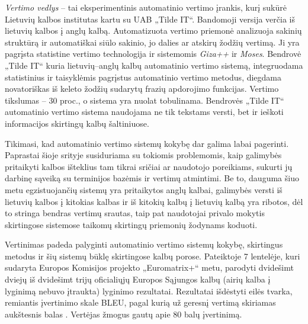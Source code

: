 \begin{multicols}{2}
   \textit{Vertimo vedlys}  – tai eksperimentinis automatinio vertimo įrankis, kurį sukūrė Lietuvių kalbos institutas kartu su UAB „Tilde IT“. Bandomoji versija verčia iš lietuvių kalbos į anglų kalbą. Automatizuota vertimo priemonė analizuoja sakinių struktūrą ir automatiškai siūlo sakinio, jo dalies ar atskirų žodžių vertimą. Ji yra pagrįsta statistine vertimo technologija ir sistemomis \textit{Giza++}  ir \textit{Moses}. Bendrovė „Tilde IT“ kuria lietuvių–anglų kalbų automatinio vertimo sistemą, integruodama statistinius ir taisyklėmis pagrįstus automatinio vertimo metodus, diegdama novatoriškas iš keleto žodžių sudarytų frazių apdorojimo funkcijas. Vertimo tikslumas – 30 proc., o sistema yra nuolat tobulinama. Bendrovės „Tilde IT“ automatinio vertimo sistema naudojama ne tik tekstams versti, bet ir ieškoti informacijos skirtingų kalbų šaltiniuose.   

    Tikimasi, kad automatinio vertimo sistemų kokybę dar galima labai pagerinti. Paprastai šioje srityje susiduriama su tokiomis problemomis, kaip galimybės pritaikyti kalbos išteklius tam tikrai sričiai ar naudotojo poreikiams, sukurti jų darbinę sąveiką su terminijos bazėmis ir vertimų atmintimi. Be to, dauguma šiuo metu egzistuojančių sistemų yra pritaikytos anglų kalbai, galimybės versti iš lietuvių kalbos į kitokias kalbas ir iš kitokių kalbų į lietuvių kalbą yra ribotos, dėl to stringa bendras vertimų srautas, taip pat naudotojai privalo mokytis skirtingose sistemose taikomų skirtingų priemonių žodynams koduoti.   

    Vertinimas padeda palyginti automatinio vertimo sistemų kokybę, skirtingus metodus ir šių sistemų būklę skirtingose kalbų porose. Pateiktoje 7 lentelėje, kuri sudaryta Europos Komisijos projekto „Euromatrix+“ metu, parodyti dvidešimt dviejų iš dvidešimt trijų oficialiųjų Europos Sąjungos kalbų (airių kalba į lyginimą nebuvo įtraukta) lyginimo rezultatai. Rezultatai išdėstyti eilės tvarka, remiantis įvertinimo skale BLEU, pagal kurią už geresnį vertimą skiriamas aukštesnis balas \cite{bleu1}.  Vertėjas žmogus gautų apie 80 balų įvertinimą.   

  


\end{multicols}
